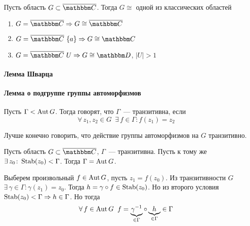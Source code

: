 \documentclass[12pt,timbord]{../../../notes}
\begin{document}
\begin{thrm}[Римана]\label{thrm:tfcv::riemanaut::rieman}
  Пусть область $G \subset \exC $. Тогда $G\cong$ одной из классических областей
  \begin{enumerate}
    \item $G = \exC \Rightarrow G \cong \exC$
    \item $G = \exC \ \{a\} \Rightarrow G \cong \C$
    \item $G = \exC \ U \Rightarrow G \cong \D$, $|U| > 1$
  \end{enumerate}
\end{thrm}

\paragraph{Лемма Шварца}
\label{par:tfcv::shwartz}


\paragraph{Лемма о подгруппе группы автоморфизмов}
\label{par:tfcv::subautgr}

\begin{defn}\label{defn:tfcv::subautgr::trans}
  Пусть $\Gamma < \operatorname{Aut} G$. Тогда говорят, что $\Gamma$~--- транзитивна, если
  \[\forall\, z_1, z_2 \in G\;\: \exists\, f \in \Gamma\colon f(z_1) = z_2\]
\end{defn}
\begin{rem*}
  Лучше конечно говорить, что действие группы автоморфизмов на $G$ транзитивно.
\end{rem*}

\begin{lem}\label{lem:tfcv::subautgr::subgrp}
  Пусть область $G\subset \exC$, $\Gamma$~--- транзитивна. Пусть к тому же $\exists\, z_0 \colon
  \operatorname{Stab}(z_0) < \Gamma$. Тогда $\Gamma=\operatorname{Aut} G$.
\end{lem}
\begin{itlproof}
  Выберем произвольный $f \in \operatorname{Aut} G$, пусть $z_1 = f(z_0)$. Из транзитивности $G$ 
  $\exists\, \gamma\in \Gamma\colon \gamma(z_1) = z_0$. Тогда $h = \gamma\circ f\in \operatorname{Stab} (z_0)$.
  Но из второго условия $\operatorname{Stab} (z_0) < \Gamma \Rightarrow h \in \Gamma$. Но тогда 
  \[
    \forall\, f\in \operatorname{Aut} G  \;\;f = \underbrace{\gamma^{-1}}_{\in \Gamma} \circ \underbrace{h}_{\in
    \Gamma} \in \Gamma
  \]
\end{itlproof}
\end{document}
